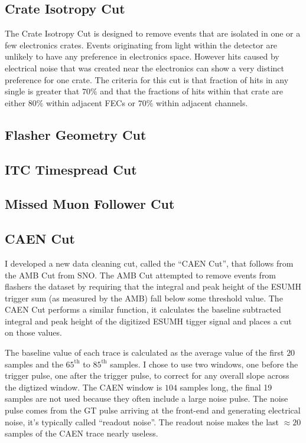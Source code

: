 \subsection{Crate Isotropy Cut}
The Crate Isotropy Cut is designed to remove events that are isolated
in one or a few electronics crates.
Events originating from light within the detector are unlikely to have any
preference in electronics space.
However hits caused by electrical noise that was created near the electronics
can show a very distinct preference for one crate.
The criteria for this cut is that fraction of hits in any single
is greater that $70\%$ and that the fractions of hits within
that crate are either $80\%$ within adjacent FECs or $70\%$ within
adjacent channels.
\subsection{Flasher Geometry Cut}
\subsection{ITC Timespread Cut}
\subsection{Missed Muon Follower Cut}
\subsection{CAEN Cut}
I developed a new data cleaning cut, called the ``CAEN Cut'', that follows from
the AMB Cut from SNO.
The AMB Cut attempted to remove events from flashers the dataset by requiring
that the integral and peak height of the ESUMH trigger sum (as measured by the
AMB) fall below some threshold value.
The CAEN Cut performs a similar function, it calculates the baseline subtracted
integral and peak height of the digitized ESUMH tigger signal and places a cut on those values.

The baseline value of each trace is calculated as the average value of the first
$20$ samples and the $65^{\text{th}}$ to $85^{\text{th}}$ samples.
I chose to use two windows, one before the trigger pulse, one after the trigger pulse, to
correct for any overall slope across the digtized window.
The CAEN window is $104$ samples long, the final 19 samples are not used because they often
include a large noise pulse.
The noise pulse comes from the GT pulse arriving at the front-end and generating electrical noise,
it's typically called ``readout noise''.
The readout noise makes the last $\approx20$ samples of the CAEN trace nearly
useless.

